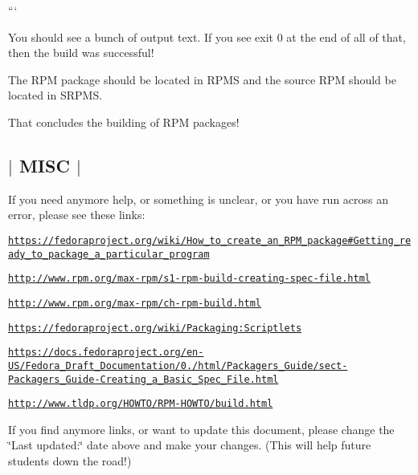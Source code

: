```

You should see a bunch of output text. If you see {\ttfamily exit 0} at the end of all of that, then the build was successful!

The R\-P\-M package should be located in {\ttfamily R\-P\-M\-S} and the source R\-P\-M should be located in {\ttfamily S\-R\-P\-M\-S}.

That concludes the building of R\-P\-M packages! 

 \subsection*{$\vert$ M\-I\-S\-C $\vert$ }

If you need anymore help, or something is unclear, or you have run across an error, please see these links\-:

\href{https://fedoraproject.org/wiki/How_to_create_an_RPM_package#Getting_ready_to_package_a_particular_program}{\tt https\-://fedoraproject.\-org/wiki/\-How\-\_\-to\-\_\-create\-\_\-an\-\_\-\-R\-P\-M\-\_\-package\#\-Getting\-\_\-ready\-\_\-to\-\_\-package\-\_\-a\-\_\-particular\-\_\-program}

\href{http://www.rpm.org/max-rpm/s1-rpm-build-creating-spec-file.html}{\tt http\-://www.\-rpm.\-org/max-\/rpm/s1-\/rpm-\/build-\/creating-\/spec-\/file.\-html}

\href{http://www.rpm.org/max-rpm/ch-rpm-build.html}{\tt http\-://www.\-rpm.\-org/max-\/rpm/ch-\/rpm-\/build.\-html}

\href{https://fedoraproject.org/wiki/Packaging:Scriptlets}{\tt https\-://fedoraproject.\-org/wiki/\-Packaging\-:\-Scriptlets}

\href{https://docs.fedoraproject.org/en-US/Fedora_Draft_Documentation/0.1/html/Packagers_Guide/sect-Packagers_Guide-Creating_a_Basic_Spec_File.html}{\tt https\-://docs.\-fedoraproject.\-org/en-\/\-U\-S/\-Fedora\-\_\-\-Draft\-\_\-\-Documentation/0./html/\-Packagers\-\_\-\-Guide/sect-\/\-Packagers\-\_\-\-Guide-\/\-Creating\-\_\-a\-\_\-\-Basic\-\_\-\-Spec\-\_\-\-File.\-html}

\href{http://www.tldp.org/HOWTO/RPM-HOWTO/build.html}{\tt http\-://www.\-tldp.\-org/\-H\-O\-W\-T\-O/\-R\-P\-M-\/\-H\-O\-W\-T\-O/build.\-html}

If you find anymore links, or want to update this document, please change the \char`\"{}\-Last updated\-:\char`\"{} date above and make your changes. (This will help future students down the road!) 